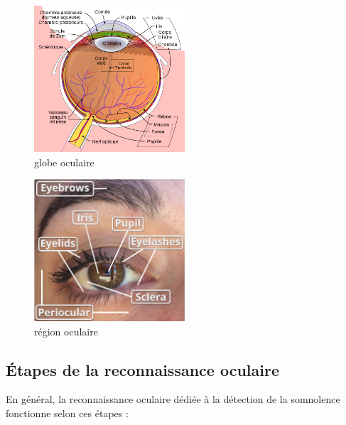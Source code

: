 \begin{figure}[htbp]
    \centering
    \includegraphics[width=0.5\textwidth ]{img/region_oculaire.png}
    \caption{globe oculaire }
    
\end{figure}
\begin{figure}[htbp]
    \centering
    \includegraphics[width=0.5\textwidth ]{img/composants oculaire.png}
    \caption{région oculaire}

\end{figure}

\newpage


\subsection{Étapes de la reconnaissance oculaire}
 En général, la reconnaissance oculaire dédiée à la détection de la somnolence fonctionne selon ces étapes :

